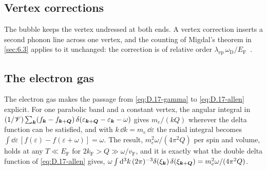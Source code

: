 \subsection*{Vertex corrections}

The bubble keeps the vertex undressed at both ends. A vertex correction inserts a second phonon line across one vertex, and the counting of Migdal's theorem in \cref{sec:6.3} applies to it unchanged: the correction is of relative order $\lambda_{\mathrm{ep}}\,\omega_{\mathrm{D}}/E_{\mathrm{F}}$~\cite{migdal1958interaction}.

\subsection*{The electron gas}

The electron gas makes the passage from \cref{eq:D.17-gamma} to \cref{eq:D.17-allen} explicit. For one parabolic band and a constant vertex, the angular integral in $(1/\mathscr{V})\sum_{\bm{k}}(f_{\bm{k}} - f_{\bm{k}+\bm{Q}})\,\delta(\varepsilon_{\bm{k}+\bm{Q}} - \varepsilon_{\bm{k}} - \omega)$ gives $m_e/(kQ)$ wherever the delta function can be satisfied, and with $k\,\dd k = m_e\,\dd\varepsilon$ the radial integral becomes $\int\dd\varepsilon\,[f(\varepsilon) - f(\varepsilon + \omega)] = \omega$. The result, $m_e^2\omega/(4\pi^2Q)$ per spin and volume, holds at any $T \ll E_{\mathrm{F}}$ for $2k_{\mathrm{F}} > Q \gg \omega/v_{\mathrm{F}}$, and it is exactly what the double delta function of \cref{eq:D.17-allen} gives, $\omega\int\mathrm{d}^3k\,(2\pi)^{-3}\delta(\xi_{\bm{k}})\,\delta(\xi_{\bm{k}+\bm{Q}}) = m_e^2\omega/(4\pi^2Q)$.
